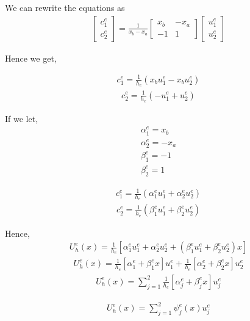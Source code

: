 We can rewrite the equations as 
\begin{eqnarray}
	\begin{bmatrix}
		c_1^{e}\\
		c_2^{e}
	\end{bmatrix}
	= \frac{1}{x_b - x_a}
	\begin{bmatrix}
		x_b & -x_a\\
		-1 & 1
	\end{bmatrix}
	\begin{bmatrix}
		u_1^{e}\\
		u_2^{e}
	\end{bmatrix}
\end{eqnarray}

Hence we get,

\begin{eqnarray}
	c_1^{e} = \frac{1}{h_e} (x_bu_1^e - x_bu_2^e)
\end{eqnarray}
\begin{eqnarray}
	c_2^{e} = \frac{1}{h_e} (-u_1^e + u_2^e)
\end{eqnarray}

If we let,
\begin{eqnarray*}
	\alpha_1^e = x_b\\
	\alpha_2^e = - x_a\\
	\beta_1^e = -1 \\
	\beta_2^e = 1	
\end{eqnarray*}

\begin{eqnarray}
	c_1^{e} = \frac{1}{h_e} (\alpha_1^e u_1^e + \alpha_2^e u_2^e)
\end{eqnarray}
\begin{eqnarray}
	c_2^{e} = \frac{1}{h_e} (\beta_1^eu_1^e + \beta_2^e u_2^e)
\end{eqnarray}

Hence,
\begin{eqnarray*}
	U_h^e(x) =  \frac{1}{h_e} [\alpha_1^e u_1^e + \alpha_2^e u_2^e + (\beta_1^eu_1^e + \beta_2^e u_2^e)x]
\end{eqnarray*}
\begin{eqnarray*}
	U_h^e(x) =  \frac{1}{h_e} [\alpha_1^e + \beta_1^e x] u_1^e + \frac{1}{h_e} [\alpha_2^e + \beta_2^e x] u_2^e
\end{eqnarray*}
\begin{eqnarray}
U_h^e(x) = \sum_{j=1}^{2} \frac{1}{h_e} [\alpha_j^e + \beta_j^e x] u_j^e 
\end{eqnarray}

\begin{eqnarray}
	U_h^e(x) = \sum_{j=1}^{2} \psi_j^e(x) u_j^e 
\end{eqnarray}


